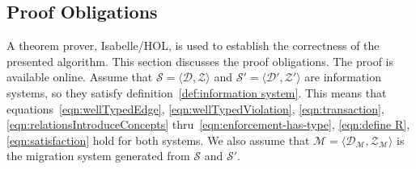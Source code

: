 \documentclass[runningheads]{llncs}
\newcommand{\pair}[2]{\langle{#1},{#2}\rangle}
\newcommand{\dataset}{\mathscr{D}}
\newcommand{\schema}{\mathscr{Z}}
\newcommand{\migrsys}{\mathscr{M}}
\newcommand{\infsys}{\mathscr{S}}
\begin{document}
\subsection{Proof Obligations}
\label{sct:Proof}
   A theorem prover, Isabelle/HOL, is used to establish the correctness of the presented algorithm.
   This section discusses the proof obligations. The proof is available online.
   Assume that $\infsys=\pair{\dataset}{\schema}$ and $\infsys'=\pair{\dataset'}{\schema'}$ are information systems, so they satisfy definition~\ref{def:information system}.
   This means that equations~\ref{eqn:wellTypedEdge}, \ref{eqn:wellTypedViolation}, \ref{eqn:transaction}, \ref{eqn:relationsIntroduceConcepts} thru~\ref{eqn:enforcement-has-type}, \ref{eqn:define R}, \ref{eqn:satisfaction} hold for both systems.
   We also assume that $\migrsys=\pair{\dataset_\migrsys}{\schema_\migrsys}$ is the migration system generated from $\infsys$ and $\infsys'$.
\end{document}
